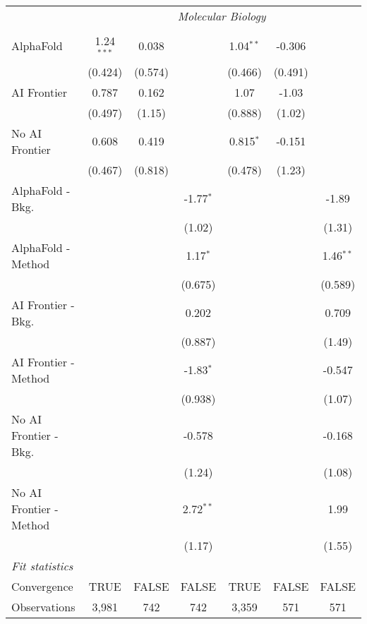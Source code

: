 \begin{tabular}{lcccccc}
 & \multicolumn{6}{c}{\textit{Molecular Biology}} \\ \\
   AlphaFold               & 1.24$^{***}$ & 0.038   &             & 1.04$^{**}$ & -0.306  &   \\   
                           & (0.424)      & (0.574) &             & (0.466)     & (0.491) &   \\   
   AI Frontier             & 0.787        & 0.162   &             & 1.07        & -1.03   &   \\   
                           & (0.497)      & (1.15)  &             & (0.888)     & (1.02)  &   \\   
   No AI Frontier          & 0.608        & 0.419   &             & 0.815$^{*}$ & -0.151  &   \\   
                           & (0.467)      & (0.818) &             & (0.478)     & (1.23)  &   \\   
   AlphaFold - Bkg.        &              &         & -1.77$^{*}$ &             &         & -1.89\\   
                           &              &         & (1.02)      &             &         & (1.31)\\   
   AlphaFold - Method      &              &         & 1.17$^{*}$  &             &         & 1.46$^{**}$\\   
                           &              &         & (0.675)     &             &         & (0.589)\\   
   AI Frontier - Bkg.      &              &         & 0.202       &             &         & 0.709\\   
                           &              &         & (0.887)     &             &         & (1.49)\\   
   AI Frontier - Method    &              &         & -1.83$^{*}$ &             &         & -0.547\\   
                           &              &         & (0.938)     &             &         & (1.07)\\   
   No AI Frontier - Bkg.   &              &         & -0.578      &             &         & -0.168\\   
                           &              &         & (1.24)      &             &         & (1.08)\\   
   No AI Frontier - Method &              &         & 2.72$^{**}$ &             &         & 1.99\\   
                           &              &         & (1.17)      &             &         & (1.55)\\   
   \midrule
   \emph{Fit statistics}\\
   Convergence             &TRUE          & FALSE   & FALSE       & TRUE        & FALSE   & FALSE\\  
   Observations            & 3,981        & 742     & 742         & 3,359       & 571     & 571\\  
   

\end{tabular}
